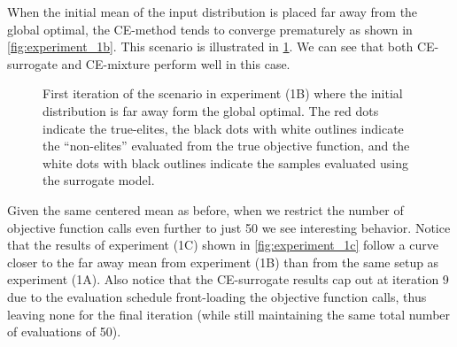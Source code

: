
When the initial mean of the input distribution is placed far away from the global optimal, the CE-method tends to converge prematurely as shown in \cref{fig:experiment_1b}.
This scenario is illustrated in \cref{fig:example_1b}.
We can see that both CE-surrogate and CE-mixture perform well in this case.

\begin{figure}[!h]
  \centering
  \resizebox{0.6\columnwidth}{!}{}
  \caption{
    \label{fig:example_1b}
    First iteration of the scenario in experiment (1B) where the initial distribution is far away form the global optimal. The red dots indicate the true-elites, the black dots with white outlines indicate the ``non-elites'' evaluated from the true objective function, and the white dots with black outlines indicate the samples evaluated using the surrogate model.
  }
\end{figure}





Given the same centered mean as before, when we restrict the number of objective function calls even further to just 50 we see interesting behavior.
Notice that the results of experiment (1C) shown in \cref{fig:experiment_1c} follow a curve closer to the far away mean from experiment (1B) than from the same setup as experiment (1A). Also notice that the CE-surrogate results cap out at iteration 9 due to the evaluation schedule front-loading the objective function calls, thus leaving none for the final iteration (while still maintaining the same total number of evaluations of 50).




